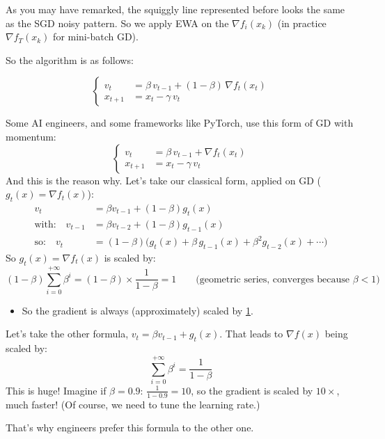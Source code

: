 
As you may have remarked, the squiggly line represented before looks the same as the SGD noisy pattern. So we apply EWA on the $\nabla f_i(x_k)$ (in practice $\nabla f_T(x_k)$ for mini-batch GD).

So the algorithm is as follows:
\begin{keyformula}
\[
\left\{\begin{aligned}
v_t&=\beta\,v_{t-1}+(1-\beta)\,\nabla f_t(x_t)\\
x_{t+1}&=x_t-\gamma\,v_t
\end{aligned}\right.
\]
\end{keyformula}

\Rem Some AI engineers, and some frameworks like PyTorch, use this form of GD with momentum:
\[
\left\{\begin{aligned}
v_t&=\beta\,v_{t-1}+\nabla f_t(x_t)\\
x_{t+1}&=x_t-\gamma\,v_t
\end{aligned}\right.
\]
And this is the reason why. Let's take our classical form, applied on GD ($g_t(x)=\nabla f_t(x)$):
\begin{align*}
v_t&=\beta v_{t-1}+(1-\beta)g_t(x)\\
\text{with:}\quad v_{t-1}&=\beta v_{t-2}+(1-\beta)g_{t-1}(x)\\
\text{so:}\quad v_t&=(1-\beta)\bigl(g_t(x)+\beta\,g_{t-1}(x)+\beta^2 g_{t-2}(x)+\cdots\bigr)
\end{align*}
So $g_t(x)=\nabla f_t(x)$ is scaled by:
\[
(1-\beta)\sum_{i=0}^{+\infty}\beta^i=(1-\beta)\times\frac{1}{1-\beta}=1\qquad\text{(geometric series, converges because $\beta<1$)}
\]
\begin{itemize}
  \item So the gradient is always (approximately) scaled by \underline{1}.
\end{itemize}

Let's take the other formula, $v_t=\beta v_{t-1}+g_t(x)$. That leads to $\nabla f(x)$ being scaled by:
\[
\sum_{i=0}^{+\infty}\beta^i=\frac{1}{1-\beta}
\]
This is huge! Imagine if $\beta=0.9$: $\frac{1}{1-0.9}=10$, so the gradient is scaled by $10\times$, much faster! (Of course, we need to tune the learning rate.)

That's why engineers prefer this formula to the other one.

